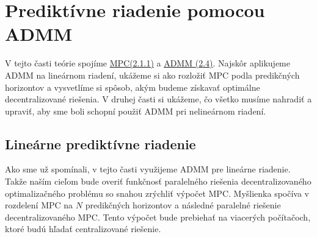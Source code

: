 \section{Prediktívne riadenie pomocou ADMM}
\label{se:MPC_ADMM}
V tejto časti teórie spojíme \hyperref[subse:MPC]{MPC(2.1.1)} a \hyperref[subse:ADMM]{ADMM (2.4)}. Najskôr aplikujeme ADMM na lineárnom riadení, ukážeme si ako rozložiť MPC podla predikčných horizontov a vysvetlíme si spôsob, akým budeme získavať optimálne decentralizované riešenia. V druhej časti si ukážeme, čo všetko musíme nahradiť a upraviť, aby sme boli schopní použiť ADMM pri nelineárnom riadení. 

\subsection{Lineárne prediktívne riadenie}
\label{subse:Lin_MPC_ADMM}
Ako sme už spomínali, v tejto časti využijeme ADMM pre lineárne riadenie. Takže naším cieľom bude overiť funkčnosť paralelného riešenia decentralizovaného optimalizačného problému so snahou zrýchliť výpočet MPC. Myšlienka spočíva v rozdelení MPC na $N$ predikčných horizontov a následné paralelné riešenie decentralizovaného MPC. Tento výpočet bude prebiehať na viacerých počítačoch, ktoré budú hľadať centralizované riešenie. 

